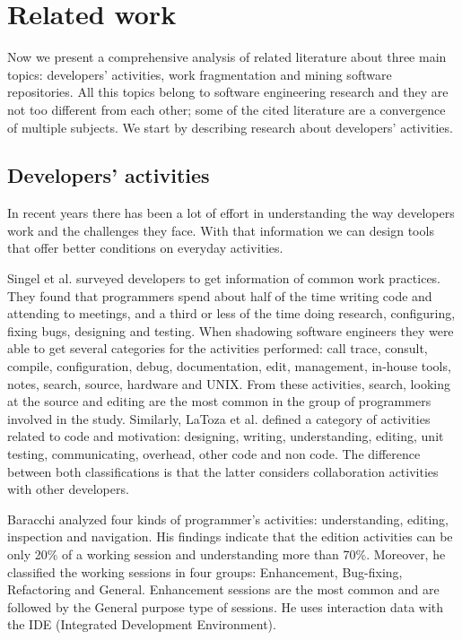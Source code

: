 \chapter{Related work}
Now we present a comprehensive analysis of related literature about three main topics: developers' activities, work fragmentation and mining software repositories. All this topics belong to software engineering research and they are not too different from each other; some of the cited literature are a convergence of multiple subjects. We start by describing research about developers' activities.

\section{Developers' activities}
In recent years there has been a lot of effort in understanding the way developers work and the challenges they face. With that information we can design tools \cite{CD10, P14, CLQ15, KM06} that offer better conditions on everyday activities. 

Singel et al. \cite{SLV10} surveyed developers to get information of common work practices. They found that programmers spend about half of the time writing code and attending to meetings, and a third or less of the time doing research, configuring, fixing bugs, designing and testing. When shadowing software engineers they were able to get several categories for the activities performed: call trace, consult, compile, configuration, debug, documentation, edit, management, in-house tools, notes, search, source, hardware and UNIX. From these activities, search, looking at the source and editing are the most common in the group of programmers involved in the study. Similarly, LaToza et al. \cite{LVD06} defined a category of activities related to code and motivation: designing, writing, understanding, editing, unit testing, communicating, overhead, other code and non code. The difference between both classifications is that the latter considers collaboration activities with other developers.

Baracchi \cite{B14} analyzed four kinds of programmer's activities: understanding, editing, inspection and navigation. His findings indicate that the edition activities can be only 20\% of a working session and understanding more than 70\%. Moreover, he classified the working sessions in four groups: Enhancement, Bug-fixing, Refactoring and General. Enhancement sessions are the most common and are followed by the General purpose type of sessions. He uses interaction data with the IDE (Integrated Development Environment).

